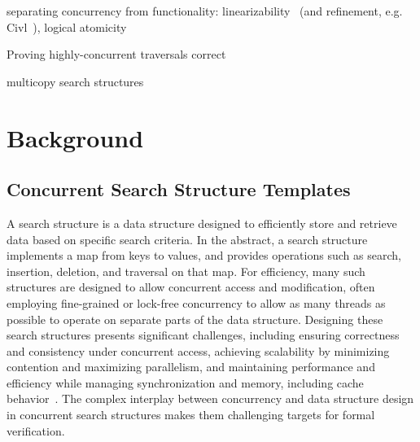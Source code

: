 \documentclass[a4paper,UKenglish,cleveref, autoref, thm-restate]{lipics-v2021}
\begin{document}


separating concurrency from functionality: linearizability~\cite{linearizability} (and refinement, e.g. Civl~\cite{civl}), logical atomicity~\cite{tada}

Proving highly-concurrent traversals correct \cite{feldman2020proving}

multicopy search structures~\cite{template-multi}

\section{Background}
\subsection{Concurrent Search Structure Templates}

A search structure is a data structure designed to efficiently store and retrieve data based on specific search criteria. In the abstract, a search structure implements a map from keys to values, and provides operations such as search, insertion, deletion, and traversal on that map. For efficiency, many such structures are designed to allow concurrent access and modification, often employing fine-grained or lock-free concurrency to allow as many threads as possible to operate on separate parts of the data structure. Designing these search structures presents significant challenges, including ensuring correctness and consistency under concurrent access, achieving scalability by minimizing contention and maximizing parallelism, and maintaining performance and efficiency while managing synchronization and memory, including cache behavior~\cite{masstree}. The complex interplay between concurrency and data structure design in concurrent search structures makes them challenging targets for formal verification.
\end{document}
